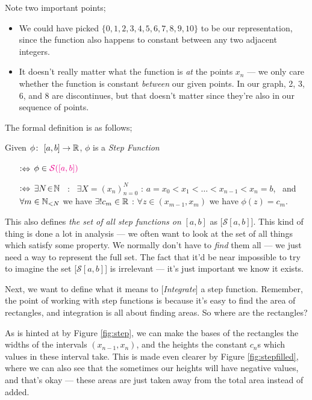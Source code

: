 \medskip
Note two important points;
\begin{itemize}
	\item We could have picked $\{0, 1, 2, 3, 4, 5, 6, 7, 8, 9, 10\}$ to be our representation, since the function also happens to constant between any two adjacent integers. 
	\item It doesn't really matter what the function is {\em at} the points $x_n$ --- we only care whether the function is constant {\em between} our given points. In our graph, 2, 3, 6, and 8 are discontinues, but that doesn't matter since they're also in our sequence of points. 
\end{itemize}

The formal definition is as follows;
\begin{definition}\label{def:stfun}
Given $\phi\colon \ [a, b] \rightarrow \mathbb{R}$, $\phi$ is a {\color{Magenta}\emph{Step Function}}
    \begin{itemize}
        \item[$\mathrel{\vcentcolon\Leftrightarrow}$]
            $\phi \in {\color{Magenta}\mathcal{S}([a, b])}$
        \item[$\mathrel{\vcentcolon\Leftrightarrow}$]
            $\exists N \! \in \! \mathbb{N}$ \ : \ $\exists X = (x_n)_{n=0}^N$ : $a = x_0 < x_1 < \ldots < x_{n-1} < x_n = b$, \ and \ $\forall m\in\mathbb{N}_{< N}$ we have $\exists! c_m \in \mathbb{R}$ : $\forall z \in (x_{m-1}, x_{m})$ we have $\phi(z) = c_m$.
    \end{itemize}
\end{definition}

This also defines \emph{the set of all step functions on} $[a, b]$ as [\emph{$\mathcal{S}[a, b]$}]. This kind of thing is done a lot in analysis --- we often want to look at the set of all things which satisfy some property. We normally don't have to \emph{find} them all --- we just need a way to represent the full set. The fact that it'd be near impossible to try to imagine the set [\emph{$\mathcal{S}[a, b]$}] is irrelevant --- it's just important we know it exists.

\medskip
Next, we want to define what it means to [\emph{Integrate}] a step function. Remember, the point of working with step functions is because it's easy to find the area of rectangles, and integration is all about finding areas. So where are the rectangles? 

\medskip
As is hinted at by Figure \ref{fig:step}, we can make the bases of the rectangles the widths of the intervals $(x_{n-1}, x_n)$, and the heights the constant $c_n$s which values in these interval take. This is made even clearer by Figure \ref{fig:stepfilled}, where we can also see that the sometimes our heights will have negative values, and that's okay --- these areas are just taken away from the total area instead of added.
 
